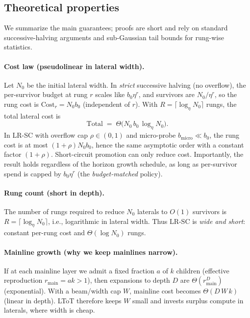 \documentclass{article}
\begin{document}
\vspace{0.5em}
\subsection{Theoretical properties}
\label{sec:theory}

We summarize the main guarantees; proofs are short and rely on standard successive-halving arguments and sub-Gaussian tail bounds for rung-wise statistics.

\paragraph{Cost law (pseudolinear in lateral width).}
Let $N_0$ be the initial lateral width.
In \emph{strict} successive halving (no overflow), the per-survivor budget at rung $r$ scales like $b_0\eta^r$, and survivors are $N_0/\eta^r$, so the rung cost is $\text{Cost}_r = N_0 b_0$ (independent of $r$).
With $R=\lceil\log_\eta N_0\rceil$ rungs, the total lateral cost is
\[
\boxed{~~\text{Total} \;=\; \Theta\!\big(N_0\,b_0\,\log_\eta N_0\big).~~}
\]
In LR-SC with overflow cap $\rho\in(0,1)$ and micro-probe $b_{\text{micro}}\ll b_0$, the rung cost is at most $(1+\rho)N_0 b_0$, hence the same asymptotic order with a constant factor $(1+\rho)$.
Short-circuit promotion can only reduce cost.
Importantly, the result holds regardless of the horizon growth schedule, as long as per-survivor spend is capped by $b_0\eta^r$ (the \emph{budget-matched} policy).

\paragraph{Rung count (short in depth).}
The number of rungs required to reduce $N_0$ laterals to $O(1)$ survivors is
$R=\lceil \log_\eta N_0\rceil$, i.e., logarithmic in lateral width.
Thus LR-SC is \emph{wide and short}: constant per-rung cost and $\Theta(\log N_0)$ rungs.

\paragraph{Mainline growth (why we keep mainlines narrow).}
If at each mainline layer we admit a fixed fraction $a$ of $k$ children (effective reproduction $r_{\text{main}}=ak>1$), then expansions to depth $D$ are $\Theta(r_{\text{main}}^D)$ (exponential).
With a beam/width cap $W$, mainline cost becomes $\Theta(D\,W\,k)$ (linear in depth).
LToT therefore keeps $W$ small and invests surplus compute in laterals, where width is cheap.
\end{document}
